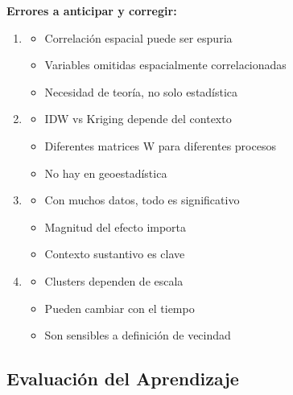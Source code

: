 \documentclass[12pt,a4paper]{article}
\begin{document}
\begin{alertbox}
\textbf{Errores a anticipar y corregir:}

\begin{enumerate}
    \item \textbf{}
    \begin{itemize}
        \item Correlación espacial puede ser espuria
        \item Variables omitidas espacialmente correlacionadas
        \item Necesidad de teoría, no solo estadística
    \end{itemize}
    
    \item \textbf{}
    \begin{itemize}
        \item IDW vs Kriging depende del contexto
        \item Diferentes matrices W para diferentes procesos
        \item No hay  en geoestadística
    \end{itemize}
    
    \item \textbf{}
    \begin{itemize}
        \item Con muchos datos, todo es significativo
        \item Magnitud del efecto importa
        \item Contexto sustantivo es clave
    \end{itemize}
    
    \item \textbf{}
    \begin{itemize}
        \item Clusters dependen de escala
        \item Pueden cambiar con el tiempo
        \item Son sensibles a definición de vecindad
    \end{itemize}
\end{enumerate}
\end{alertbox}

\subsection{Evaluación del Aprendizaje}
\end{document}
